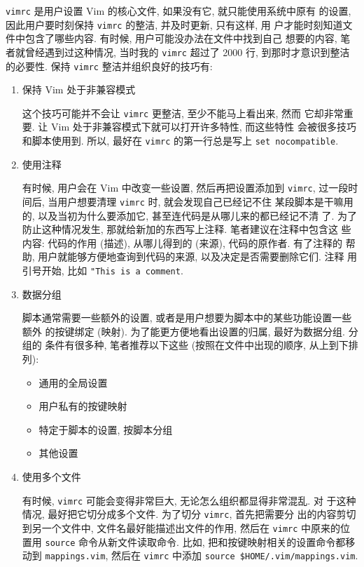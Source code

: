 \texttt{vimrc} 是用户设置 Vim 的核心文件, 如果没有它, 就只能使用系统中原有
的设置, 因此用户要时刻保持 \texttt{vimrc} 的整洁, 并及时更新, 只有这样, 用
户才能时刻知道文件中包含了哪些内容. 有时候, 用户可能没办法在文件中找到自己
想要的内容, 笔者就曾经遇到过这种情况, 当时我的 \texttt{vimrc} 超过了 2000 行,
到那时才意识到整洁的必要性. 保持 \texttt{vimrc} 整洁并组织良好的技巧有:
\begin{enumerate}
	\item 保持 Vim 处于非兼容模式

	这个技巧可能并不会让 \texttt{vimrc} 更整洁, 至少不能马上看出来, 然而
	它却非常重要. 让 Vim 处于非兼容模式下就可以打开许多特性, 而这些特性
	会被很多技巧和脚本使用到. 所以, 最好在 \texttt{vimrc} 的第一行总是写上
	\texttt{set nocompatible}.
	
	\item 使用注释

	有时候, 用户会在 Vim 中改变一些设置, 然后再把设置添加到 \texttt{vimrc},
	过一段时间后, 当用户想要清理 \texttt{vimrc} 时, 就会发现自己已经记不住
	某段脚本是干嘛用的, 以及当初为什么要添加它, 甚至连代码是从哪儿来的都已经记不清
	了. 为了防止这种情况发生, 那就给新加的东西写上注释. 笔者建议在注释中包含这
	些内容: 代码的作用 (描述), 从哪儿得到的 (来源), 代码的原作者. 有了注释的
	帮助, 用户就能够方便地查询到代码的来源, 以及决定是否需要删除它们. 注释
	用引号开始, 比如 \texttt{"This is a comment}.

	\item 数据分组

	脚本通常需要一些额外的设置, 或者是用户想要为脚本中的某些功能设置一些额外
	的按键绑定 (映射). 为了能更方便地看出设置的归属, 最好为数据分组. 分组的
	条件有很多种, 笔者推荐以下这些 (按照在文件中出现的顺序, 从上到下排列):
	\begin{itemize}
	  \item 通用的全局设置
	  \item 用户私有的按键映射
	  \item 特定于脚本的设置, 按脚本分组
	  \item 其他设置
	\end{itemize}

	\item 使用多个文件
	
	有时候, \texttt{vimrc} 可能会变得非常巨大, 无论怎么组织都显得非常混乱. 对
	于这种情况, 最好把它切分成多个文件. 为了切分 \texttt{vimrc}, 首先把需要分
	出的内容剪切到另一个文件中, 文件名最好能描述出文件的作用, 然后在
	\texttt{vimrc} 中原来的位置用 \texttt{source} 命令从新文件读取命令.
	比如, 把和按键映射相关的设置命令都移动到 \texttt{mappings.vim},
	然后在 \texttt{vimrc} 中添加 \texttt{source \$HOME/.vim/mappings.vim}.


\end{enumerate}
